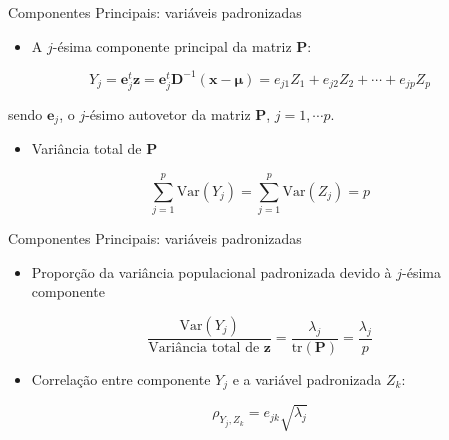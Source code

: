 \documentclass[
  ignorenonframetext,
  aspectratio=169,
]{beamer}
\providecommand{\tightlist}{%
  \setlength{\itemsep}{0pt}\setlength{\parskip}{0pt}}
\begin{document}
\begin{frame}{Componentes Principais: variáveis padronizadas}
\label{componentes-principais-variuxe1veis-padronizadas-1}
\begin{itemize}
\tightlist
\item
  A \(j\)-ésima componente principal da matriz \(\boldsymbol{P}\):
\end{itemize}

\[Y_j = \boldsymbol{e}_j^t \boldsymbol{z} =  \boldsymbol{e}_j^t \boldsymbol{D}^{-1}(\mathbf{x} - \boldsymbol{\mu}) = {e}_{j1}Z_1 + {e}_{j2}Z_2 + \cdots + {e}_{jp}Z_p\]

sendo \(\boldsymbol{e}_j\), o \(j\)-ésimo autovetor da matriz
\(\boldsymbol{P}\), \(j = 1, \cdots p\).

\pause

\begin{itemize}
\tightlist
\item
  Variância total de \(\boldsymbol{P}\)
\end{itemize}

\[\sum \limits_{j=1}^p \text{Var}(Y_j) = \sum \limits_{j=1}^p \text{Var}(Z_j) = p\]
\end{frame}

\begin{frame}{Componentes Principais: variáveis padronizadas}
\label{componentes-principais-variuxe1veis-padronizadas-2}
\begin{itemize}
\tightlist
\item
  Proporção da variância populacional padronizada devido à \(j\)-ésima
  componente
\end{itemize}

\[\dfrac{\text{Var}({Y}_j)}{\text{Variância total de } \boldsymbol{z}} = \dfrac{{\lambda}_j}{\text{tr} (\boldsymbol{P})} =  \dfrac{{\lambda}_j}{p}\]

\pause

\begin{itemize}
\tightlist
\item
  Correlação entre componente \(Y_j\) e a variável padronizada \(Z_k\):
\end{itemize}

\[\rho_{Y_j,Z_k} = e_{jk} \sqrt{\lambda_j}\]
\end{frame}
\end{document}
